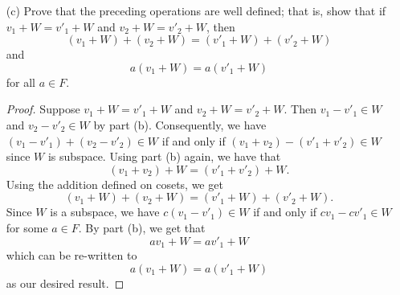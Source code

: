 \begin{enumerate}
\begin{proof}
        Conversely, suppose \( v_{1} - v_{2} \in W  \). By part (a), we know that \( (v_{1} - v_{2}) + W   \) is a subspace of \( V  \). Hence, \( 0_{V} \in (v_{1} - v_{2}) + W  \). This means that there exists \( w' \in W  \) such that 
        \begin{align*}
            &(v_{1} - v_{2}) + w' = 0_{V} \\
            &\implies v_{1} + w' = v_{2} + (w - w) \\
            &\implies v_{1} + \underbrace{(w' + w)}_{\in W} = v_{2} + \underbrace{w}_{\in W}.
        \end{align*}
        This tells us that \( v_{1} + W = v_{2} + W  \) and we are done.
        \end{proof}
    \item[(c)] Prove that the preceding operations are well defined; that is, show that if \( v_{1} + W = v'_{1} + W  \) and \( v_{2} + W = v'_{2} + W  \), then 
        \[  (v_{1} + W) + (v_{2} + W) = (v'_{1} + W) + (v'_{2} + W) \]
        and 
        \[  a(v_{1} + W) = a(v'_{1} + W) \]
        for all \( a \in F  \).
        \begin{proof}
        Suppose \( v_{1} + W = v'_{1} + W  \) and \( v_{2} + W = v'_{2} + W  \). Then \( v_{1} - v'_{1} \in W  \) and \( v_{2} - v'_{2} \in W  \) by part (b). Consequently, we have \( (v_{1} - v'_{1}) + (v_{2} - v'_{2}) \in W  \) if and only if \( (v_{1} + v_{2}) - (v'_{1} + v'_{2}) \in W  \) since \( W  \) is subspace. Using part (b) again, we have that 
        \[  (v_{1} + v_{2}) + W = (v'_{1} + v'_{2}) + W.  \]
       Using the addition defined on cosets, we get 
        \[ (v_{1} + W) + (v_{2} + W) = (v'_{1} + W) + (v'_{2} + W).   \]
        Since \( W  \) is a subspace, we have \( c(v_{1} - v'_{1}) \in W  \) if and only if \(cv_{1} - cv'_{1} \in W   \) for some \( a \in F  \). By part (b), we get that 
        \[  av_{1} + W = av'_{1} + W \]
        which can be re-written to
        \[  a(v_{1} + W) = a(v'_{1} + W) \]
        as our desired result.
        

\end{proof}
\end{enumerate}
